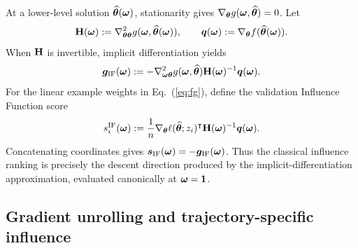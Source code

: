 At a lower-level solution $\widehat{{\bm{\theta}}}({\bm{\omega}})$, stationarity gives
$\nabla_{{\bm{\theta}}}g({\bm{\omega}},\widehat{{\bm{\theta}}})=0$. Let
\begin{equation}
{\mathbf{H}}({\bm{\omega}}):=\nabla^2_{{\bm{\theta}}{\bm{\theta}}}
g({\bm{\omega}},\widehat{{\bm{\theta}}}({\bm{\omega}})),
\qquad
{\bm{q}}({\bm{\omega}}):=\nabla_{{\bm{\theta}}}f(\widehat{{\bm{\theta}}}({\bm{\omega}})).
\end{equation}
When ${\mathbf{H}}$ is invertible, implicit differentiation yields
\begin{equation}
{\bm{g}}_{\mathrm{IF}}({\bm{\omega}})
:=-\nabla^2_{{\bm{\omega}}{\bm{\theta}}}g({\bm{\omega}},\widehat{{\bm{\theta}}})
{\mathbf{H}}({\bm{\omega}})^{-1}{\bm{q}}({\bm{\omega}}).
\label{eq:if-hypergradient}
\end{equation}
For the linear example weights in Eq.~(\ref{eq:fg}), define the validation
Influence Function score \citep{koh2017influence}
\begin{equation}
s_i^{\mathrm{IF}}({\bm{\omega}})
:=\frac{1}{n}\nabla_{{\bm{\theta}}}\ell(\widehat{{\bm{\theta}}};z_i)^\intercal
{\mathbf{H}}({\bm{\omega}})^{-1}{\bm{q}}({\bm{\omega}}).
\label{eq:if-score}
\end{equation}
Concatenating coordinates gives
$\bm{s}_{\mathrm{IF}}({\bm{\omega}})=-{\bm{g}}_{\mathrm{IF}}({\bm{\omega}})$. Thus the
classical influence ranking is precisely the descent direction produced by
the implicit-differentiation approximation, evaluated canonically at
${\bm{\omega}}=\bm{1}$.

\subsection{Gradient unrolling and trajectory-specific influence}

